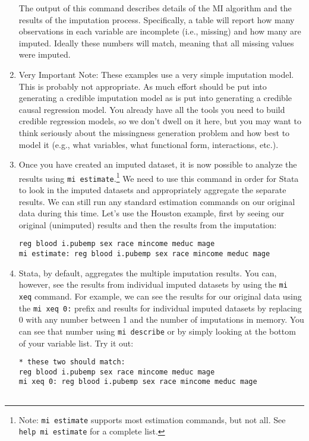 \documentclass[a4paper,12pt]{article}
\begin{document}
\begin{enumerate}
The output of this command describes details of the MI algorithm and the results of the imputation process. Specifically, a table will report how many observations in each variable are incomplete (i.e., missing) and how many are imputed. Ideally these numbers will match, meaning that all missing values were imputed.

\item Very Important Note: These examples use a very simple imputation model. This is probably not appropriate. As much effort should be put into generating a credible imputation model as is put into generating a credible causal regression model. You already have all the tools you need to build credible regression models, so we don't dwell on it here, but you may want to think seriously about the missingness generation problem and how best to model it (e.g., what variables, what functional form, interactions, etc.).

\item Once you have created an imputed dataset, it is now possible to analyze the results using \texttt{mi estimate}.\footnote{Note: \texttt{mi estimate} supports most estimation commands, but not all. See \texttt{help mi estimate} for a complete list.} We need to use this command in order for Stata to look in the imputed datasets and appropriately aggregate the separate results. We can still run any standard estimation commands on our original data during this time. Let's use the Houston example, first by seeing our original (unimputed) results and then the results from the imputation:
\begin{verbatim}
reg blood i.pubemp sex race mincome meduc mage
mi estimate: reg blood i.pubemp sex race mincome meduc mage
\end{verbatim}

\item Stata, by default, aggregates the multiple imputation results. You can, however, see the results from individual imputed datasets by using the \texttt{mi xeq} command. For example, we can see the results for our original data using the \texttt{mi xeq 0:} prefix and results for individual imputed datasets by replacing 0 with any number between 1 and the number of imputations in memory. You can see that number using \texttt{mi describe} or by simply looking at the bottom of your variable list. Try it out:
\begin{verbatim}
* these two should match:
reg blood i.pubemp sex race mincome meduc mage
mi xeq 0: reg blood i.pubemp sex race mincome meduc mage


\end{verbatim}
\end{enumerate}
\end{document}
